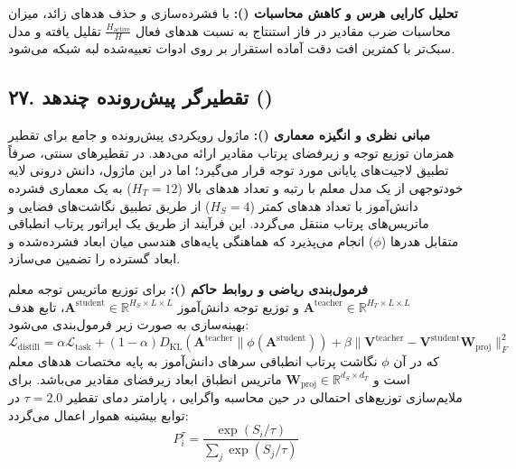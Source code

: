 \textbf{تحلیل کارایی هرس و کاهش محاسبات ():}
با فشرده‌سازی و حذف هدهای زائد، میزان محاسبات ضرب مقادیر در فاز استنتاج به نسبت هدهای فعال $\frac{H_{\text{active}}}{H}$ تقلیل یافته و مدل سبک‌تر با کمترین افت دقت آماده استقرار بر روی ادوات تعبیه‌شده لبه شبکه می‌شود.



\subsection*{۲۷. تقطیرگر پیش‌رونده چندهد  ()}

\textbf{مبانی نظری و انگیزه معماری ():}
ماژول  رویکردی پیش‌رونده و جامع برای تقطیر همزمان توزیع توجه و زیرفضای پرتاب مقادیر ارائه می‌دهد. در تقطیرهای سنتی، صرفاً تطبیق لاجیت‌های پایانی مورد توجه قرار می‌گیرد؛ اما در این ماژول، دانش درونی لایه خودتوجهی از یک مدل معلم با رتبه و تعداد هدهای بالا ($H_T = 12$) به یک معماری فشرده دانش‌آموز با تعداد هدهای کمتر ($H_S = 4$) از طریق تطبیق نگاشت‌های فضایی و ماتریس‌های پرتاب منتقل می‌گردد.
این فرآیند از طریق یک اپراتور پرتاب انطباقی متقابل هدرها ($\phi$) انجام می‌پذیرد که هماهنگی پایه‌های هندسی میان ابعاد فشرده‌شده و ابعاد گسترده را تضمین می‌سازد.

\textbf{فرمول‌بندی ریاضی و روابط حاکم ():}
برای توزیع ماتریس توجه معلم $\mathbf{A}^{\text{teacher}} \in \mathbb{R}^{H_T \times L \times L}$ و توزیع توجه دانش‌آموز $\mathbf{A}^{\text{student}} \in \mathbb{R}^{H_S \times L \times L}$، تابع هدف بهینه‌سازی به صورت زیر فرمول‌بندی می‌شود:
\begin{equation}
\mathcal{L}_{\text{distill}} = \alpha \mathcal{L}_{\text{task}} + (1 - \alpha) D_{\text{KL}}\left(\mathbf{A}^{\text{teacher}} \parallel \phi(\mathbf{A}^{\text{student}})\right) + \beta \|\mathbf{V}^{\text{teacher}} - \mathbf{V}^{\text{student}} \mathbf{W}_{\text{proj}}\|_F^2
\end{equation}
که در آن $\phi$ نگاشت پرتاب انطباقی سرهای دانش‌آموز به پایه مختصات هدهای معلم است و $\mathbf{W}_{\text{proj}} \in \mathbb{R}^{d_S \times d_T}$ ماتریس انطباق ابعاد زیرفضای مقادیر می‌باشد.
برای ملایم‌سازی توزیع‌های احتمالی در حین محاسبه واگرایی ، پارامتر دمای تقطیر $\tau = 2.0$ در توابع بیشینه هموار اعمال می‌گردد:
\begin{equation}
P_i^{\tau} = \frac{\exp(S_i / \tau)}{\sum_j \exp(S_j / \tau)}
\end{equation}

